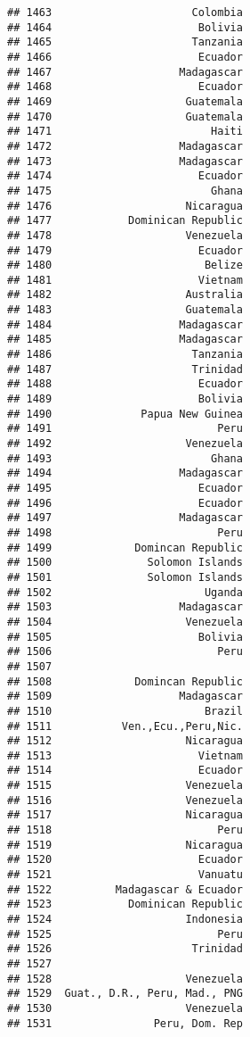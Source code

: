 \documentclass[
]{article}
\begin{document}
\begin{verbatim}
## 1463                      Colombia
## 1464                       Bolivia
## 1465                      Tanzania
## 1466                       Ecuador
## 1467                    Madagascar
## 1468                       Ecuador
## 1469                     Guatemala
## 1470                     Guatemala
## 1471                         Haiti
## 1472                    Madagascar
## 1473                    Madagascar
## 1474                       Ecuador
## 1475                         Ghana
## 1476                     Nicaragua
## 1477            Dominican Republic
## 1478                     Venezuela
## 1479                       Ecuador
## 1480                        Belize
## 1481                       Vietnam
## 1482                     Australia
## 1483                     Guatemala
## 1484                    Madagascar
## 1485                    Madagascar
## 1486                      Tanzania
## 1487                      Trinidad
## 1488                       Ecuador
## 1489                       Bolivia
## 1490              Papua New Guinea
## 1491                          Peru
## 1492                     Venezuela
## 1493                         Ghana
## 1494                    Madagascar
## 1495                       Ecuador
## 1496                       Ecuador
## 1497                    Madagascar
## 1498                          Peru
## 1499             Domincan Republic
## 1500               Solomon Islands
## 1501               Solomon Islands
## 1502                        Uganda
## 1503                    Madagascar
## 1504                     Venezuela
## 1505                       Bolivia
## 1506                          Peru
## 1507                              
## 1508             Domincan Republic
## 1509                    Madagascar
## 1510                        Brazil
## 1511           Ven.,Ecu.,Peru,Nic.
## 1512                     Nicaragua
## 1513                       Vietnam
## 1514                       Ecuador
## 1515                     Venezuela
## 1516                     Venezuela
## 1517                     Nicaragua
## 1518                          Peru
## 1519                     Nicaragua
## 1520                       Ecuador
## 1521                       Vanuatu
## 1522          Madagascar & Ecuador
## 1523            Dominican Republic
## 1524                     Indonesia
## 1525                          Peru
## 1526                      Trinidad
## 1527                              
## 1528                     Venezuela
## 1529  Guat., D.R., Peru, Mad., PNG
## 1530                     Venezuela
## 1531                Peru, Dom. Rep

\end{verbatim}
\end{document}
